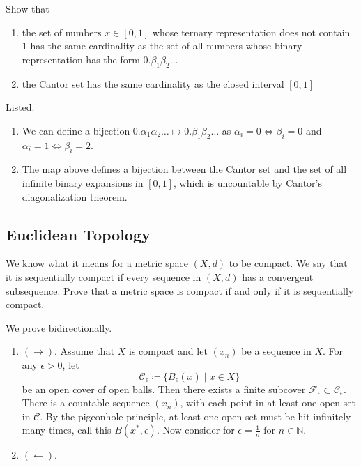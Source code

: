   \begin{exercise}[Zorich 2.4.8]
    Show that 
    \begin{enumerate}
      \item the set of numbers $x \in [0, 1]$ whose ternary representation does not contain $1$ has the same cardinality as the set of all numbers whose binary representation has the form $0.\beta_1 \beta_2 \ldots$ 
      \item the Cantor set has the same cardinality as the closed interval $[0, 1]$ 
    \end{enumerate}
  \end{exercise}
  \begin{solution}
    Listed. 
    \begin{enumerate}
      \item We can define a bijection $0.\alpha_1 \alpha_2 \ldots \mapsto 0.\beta_1 \beta_2 \ldots$ as $\alpha_i = 0 \iff \beta_i = 0$ and $\alpha_i = 1 \iff \beta_i = 2$. 
      \item The map above defines a bijection between the Cantor set and the set of all infinite binary expansions in $[0, 1]$, which is uncountable by Cantor's diagonalization theorem. 
    \end{enumerate}
  \end{solution}

\subsection{Euclidean Topology} 

  \begin{exercise}
    We know what it means for a metric space $(X,d)$ to be compact. We say that it is sequentially compact if every sequence in $(X,d)$ has a convergent subsequence. Prove that a metric space is compact if and only if it is sequentially compact.
  \end{exercise}
  \begin{solution}
    We prove bidirectionally. 
    \begin{enumerate}
      \item $(\rightarrow)$. Assume that $X$ is compact and let $(x_n)$ be a sequence in $X$. For any $\epsilon > 0$, let 
      \begin{equation}
        \mathscr{C}_{\epsilon} \coloneqq \{B_{\epsilon} (x) \mid x \in X\}
      \end{equation}
      be an open cover of open balls. Then there exists a finite subcover $\mathcal{F}_\epsilon \subset \mathscr{C}_\epsilon$. There is a countable sequence $(x_n)$, with each point in at least one open set in $\mathscr{C}$. By the pigeonhole principle, at least one open set must be hit infinitely many times, call this $B (x^\ast, \epsilon)$. Now consider for $\epsilon = \frac{1}{n}$ for $n \in \mathbb{N}$. 
      \item $(\leftarrow)$. 
    \end{enumerate}
  \end{solution}

